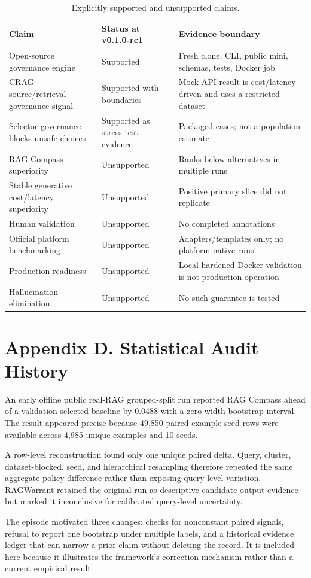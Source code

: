 \documentclass[11pt]{article}
\begin{document}
\begin{table}[t]
\centering
\caption{Explicitly supported and unsupported claims.}
\small
\begin{tabularx}{\linewidth}{>{\raggedright\arraybackslash}X>{\raggedright\arraybackslash}X>{\raggedright\arraybackslash}X}
\toprule
\textbf{Claim} & \textbf{Status at v0.1.0-rc1} & \textbf{Evidence boundary} \\
\midrule
Open-source governance engine & Supported & Fresh clone, CLI, public mini, schemas, tests, Docker job \\
CRAG source/retrieval governance signal & Supported with boundaries & Mock-API result is cost/latency driven and uses a restricted dataset \\
Selector governance blocks unsafe choices & Supported as stress-test evidence & Packaged cases; not a population estimate \\
RAG Compass superiority & Unsupported & Ranks below alternatives in multiple runs \\
Stable generative cost/latency superiority & Unsupported & Positive primary slice did not replicate \\
Human validation & Unsupported & No completed annotations \\
Official platform benchmarking & Unsupported & Adapters/templates only; no platform-native runs \\
Production readiness & Unsupported & Local hardened Docker validation is not production operation \\
Hallucination elimination & Unsupported & No such guarantee is tested \\
\bottomrule
\end{tabularx}
\end{table}

\section{Appendix D. Statistical Audit History}
An early offline public real-RAG grouped-split run reported RAG Compass ahead of a validation-selected baseline by 0.0488 with a zero-width bootstrap interval. The result appeared precise because 49,850 paired example-seed rows were available across 4,985 unique examples and 10 seeds.

A row-level reconstruction found only one unique paired delta. Query, cluster, dataset-blocked, seed, and hierarchical resampling therefore repeated the same aggregate policy difference rather than exposing query-level variation. RAGWarrant retained the original run as descriptive candidate-output evidence but marked it inconclusive for calibrated query-level uncertainty.

The episode motivated three changes: checks for nonconstant paired signals, refusal to report one bootstrap under multiple labels, and a historical evidence ledger that can narrow a prior claim without deleting the record. It is included here because it illustrates the framework's correction mechanism rather than a current empirical result.



\end{document}
